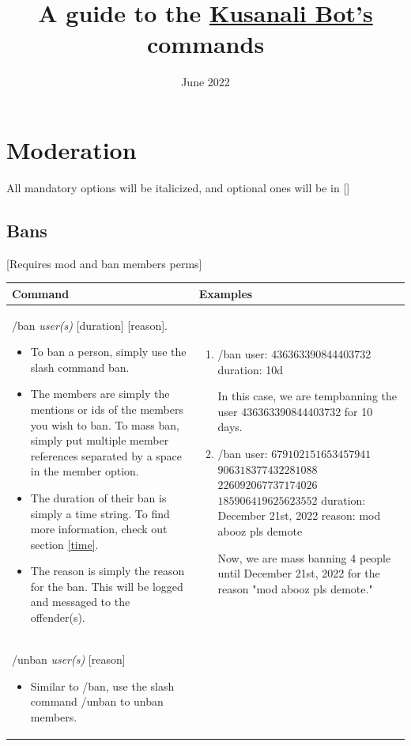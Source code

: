 \documentclass{scrartcl}
\title{A guide to the \href{https://github.com/The-Academia-Kusanali-Mains/Kusanali-Bot}{Kusanali Bot's} commands}
\author{\text{bryanli\#2718}}
\date{June 2022}
\begin{document}
\maketitle
\tableofcontents
\newpage

\section{Moderation}
All mandatory options will be italicized, and optional ones will be in []
\subsection{Bans}[Requires mod and ban members perms]
\begin{tabularx}{\textwidth}{|>{\raggedright\arraybackslash}X|>{\raggedright\arraybackslash}X|}
\hline 
Command & Examples\\
\hline
/ban \textit{user(s)} [duration] [reason].

\begin{itemize}
    \item To ban a person, simply use the slash command ban.
    
    \item The members are simply the mentions or ids of the members you wish to ban. To mass ban, simply put multiple member references separated by a space in the member option. 

    \item The duration of their ban is simply a time string. To find more information, check out section \ref{time}.

    \item The reason is simply the reason for the ban. This will be logged and messaged to the offender(s). 
\end{itemize}
& \begin{enumerate}
    \item 
    /ban \color{black} user: \color{gray}436363390844403732 \color{black} 
    duration: \color{gray}10d \color{black}
    
    In this case, we are tempbanning the user 436363390844403732 for 10 days.
    \item
    /ban \color{black} user: \color{gray}$679102151653457941$ $906318377432281088$ $226092067737174026$ $185906419625623552$ \color{black}duration: \color{gray}December 21st, 2022 \color{black} reason: \color{gray} mod abooz pls demote\color{black}
    
    Now, we are mass banning 4 people until December 21st, 2022 for the reason "mod abooz pls demote."
\end{enumerate}\\
\hline
/unban \textit{user(s)} [reason]
\begin{itemize}
    \item Similar to /ban, use the slash command /unban to unban members. 
    

\end{itemize}
\end{tabularx}
\end{document}

